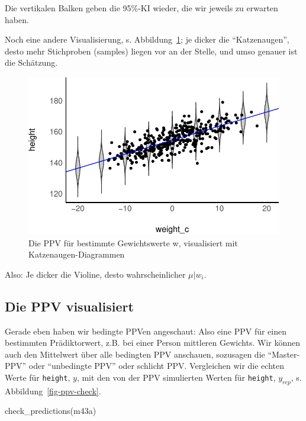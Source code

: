 \documentclass[
  a4paper,
  DIV=11]{scrreprt}
\newenvironment{Shaded}{\begin{snugshade}}{\end{snugshade}}
\newcommand{\FunctionTok}[1]{\textcolor[rgb]{0.28,0.35,0.67}{#1}}
\newcommand{\NormalTok}[1]{\textcolor[rgb]{0.00,0.23,0.31}{#1}}
\theoremstyle{definition}
\theoremstyle{remark}
\begin{document}
Die vertikalen Balken geben die 95\%-KI wieder, die wir jeweils zu
erwarten haben.

Noch eine andere Visualisierung, s. Abbildung~\ref{fig-katzenaugen}; je
dicker die ``Katzenaugen'', desto mehr Stichproben (samples) liegen vor
an der Stelle, und umso genauer ist die Schätzung.

\begin{figure}

{\centering \includegraphics{./lineare-modelle_files/figure-pdf/fig-katzenaugen-1.pdf}

}

\caption{\label{fig-katzenaugen}Die PPV für bestimmte Gewichtswerte w,
visualisiert mit Katzenaugen-Diagrammen}

\end{figure}

Also: Je dicker die Violine, desto wahrscheinlicher \(\mu | w_i\).

\hypertarget{die-ppv-visualisiert}{%
\subsection{Die PPV visualisiert}\label{die-ppv-visualisiert}}

Gerade eben haben wir bedingte PPVen angeschaut: Also eine PPV für einen
bestimmten Prädiktorwert, z.B. bei einer Person mittleren Gewichts. Wir
können auch den Mittelwert über alle bedingten PPV anschauen, sozusagen
die ``Master-PPV'' oder ``unbedingte PPV'' oder schlicht PPV.
Vergleichen wir die echten Werte für \texttt{height}, \(y\), mit den von
der PPV simulierten Werten für \texttt{height}, \(y_{rep}\), s.
Abbildung~\ref{fig-ppv-check}.

\begin{Shaded}
\begin{Highlighting}[]
\FunctionTok{check\_predictions}\NormalTok{(m43a) }
\end{Highlighting}
\end{Shaded}
\end{document}
